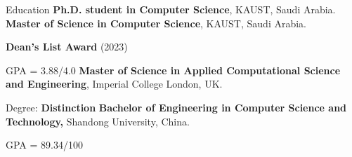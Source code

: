 \begin{rubric}{Education}
%
	\textbf{Ph.D. student in Computer Science}, KAUST, Saudi Arabia.
%
%
	\textbf{Master of Science in Computer Science}, KAUST, Saudi Arabia.
	\par \textbf{Dean's List Award} (2023)
	\par GPA = 3.88/4.0
% 
%
	\textbf{Master of Science in Applied Computational Science and Engineering}, Imperial College London, UK.
	\par Degree: \textbf{Distinction}
%
	\textbf{Bachelor of Engineering in Computer Science and Technology,} Shandong University, China.
	\par GPA = 89.34/100
\end{rubric}